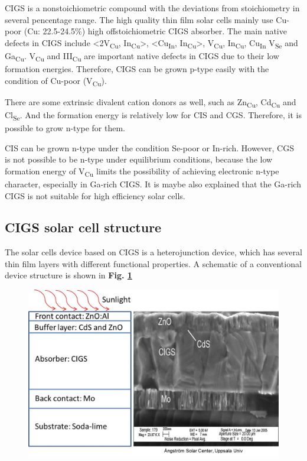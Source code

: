 \documentclass[a4paper, 12pt, titlepage,oneside,drop]{kthesis}
\begin{document}
CIGS is a nonstoichiometric compound with the deviations from stoichiometry in several pencentage range. The high quality thin film solar cells mainly use Cu-poor (Cu: 22.5-24.5\%) high offstoichiometric CIGS absorber.
The main native defects in CIGS include <2V\textsubscript{Cu}, In\textsubscript{Cu}>, <Cu\textsubscript{In}, In\textsubscript{Cu}>, V\textsubscript{Cu}, In\textsubscript{Cu}, Cu\textsubscript{In} V\textsubscript{Se}
and Ga\textsubscript{Cu}. V\textsubscript{Cu} and III\textsubscript{Cu} are important native defects in CIGS due to
their low formation energies. Therefore, CIGS can be grown p-type easily with the condition of Cu-poor (V\textsubscript{Cu}).

There are some extrinsic divalent cation donors as well, such as Zn\textsubscript{Cu}, Cd\textsubscript{Cu} and Cl\textsubscript{Se}. And the formation energy is relatively low for CIS and CGS. Therefore, it is possible to grow n-type for them.

CIS can be grown n-type under the condition Se-poor or In-rich. However, CGS is not possible to be n-type under equilibrium conditions, because the low formation energy of V\textsubscript{Cu} limits the possibility of achieving electronic n-type character, especially in Ga-rich CIGS.
It is maybe also explained that the Ga-rich CIGS is not suitable for high efficiency solar cells. 


\subsection{CIGS solar cell structure}

The solar cells device based on CIGS is a heterojunction device, which has several thin film layers with different functional properties. A schematic of a conventional device structure is shown in  \textbf{Fig. \ref{device}}

\begin{figure}[H]
\centering
\includegraphics[scale=0.5]{devicestruc.jpg} 
\caption{}
\label{device}
\end{figure}
\end{document}
